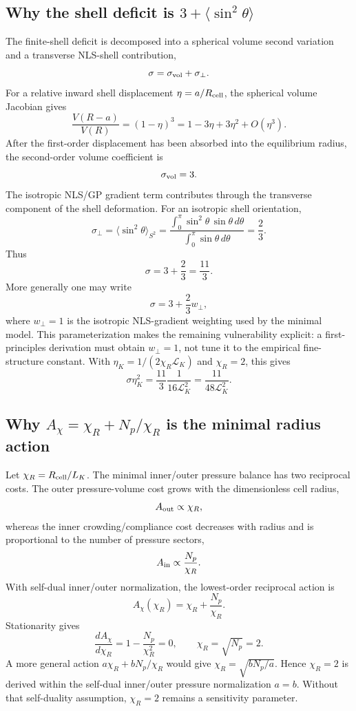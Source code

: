 \documentclass[11pt]{article}
\begin{document}
\subsection{Why the shell deficit is \(3+\langle\sin^2\theta\rangle\)}
\label{subsec:why-shell-deficit}

The finite-shell deficit is decomposed into a spherical volume second variation
and a transverse NLS-shell contribution,
\[
  \sigma=\sigma_{\rm vol}+\sigma_{\perp}.
\]
For a relative inward shell displacement \(\eta=a/R_{\rm cell}\), the spherical
volume Jacobian gives
\[
  \frac{V(R-a)}{V(R)}
  =
  (1-\eta)^3
  =
  1-3\eta+3\eta^2+O(\eta^3).
\]
After the first-order displacement has been absorbed into the equilibrium
radius, the second-order volume coefficient is
\[
  \sigma_{\rm vol}=3.
\]
The isotropic NLS/GP gradient term contributes through the transverse component
of the shell deformation.  For an isotropic shell orientation,
\[
  \sigma_\perp
  =
  \langle\sin^2\theta\rangle_{S^2}
  =
  \frac{\int_0^\pi \sin^2\theta\,\sin\theta\,d\theta}
       {\int_0^\pi \sin\theta\,d\theta}
  =
  \frac{2}{3}.
\]
Thus
\[
  \sigma=3+\frac{2}{3}=\frac{11}{3}.
\]
More generally one may write
\[
  \sigma=3+\frac{2}{3}w_\perp,
\]
where \(w_\perp=1\) is the isotropic NLS-gradient weighting used by the
minimal model.  This parameterization makes the remaining vulnerability
explicit: a first-principles derivation must obtain \(w_\perp=1\), not tune it
to the empirical fine-structure constant.
With \(\eta_K=1/(2\chi_R\mathcal L_K)\) and \(\chi_R=2\), this gives
\[
  \sigma\eta_K^2
  =
  \frac{11}{3}\frac{1}{16\mathcal L_K^2}
  =
  \frac{11}{48\mathcal L_K^2}.
\]

\subsection{Why \(A_\chi=\chi_R+N_p/\chi_R\) is the minimal radius action}
\label{subsec:why-radius-action}

Let \(\chi_R=R_{\rm cell}/L_K\).  The minimal inner/outer pressure balance has
two reciprocal costs.  The outer pressure-volume cost grows with the
dimensionless cell radius,
\[
  A_{\rm out}\propto \chi_R,
\]
whereas the inner crowding/compliance cost decreases with radius and is
proportional to the number of pressure sectors,
\[
  A_{\rm in}\propto \frac{N_p}{\chi_R}.
\]
With self-dual inner/outer normalization, the lowest-order reciprocal action is
\[
  A_\chi(\chi_R)
  =
  \chi_R+\frac{N_p}{\chi_R}.
\]
Stationarity gives
\[
  \frac{dA_\chi}{d\chi_R}
  =
  1-\frac{N_p}{\chi_R^2}=0,
  \qquad
  \chi_R=\sqrt{N_p}=2.
\]
A more general action \(a\chi_R+bN_p/\chi_R\) would give
\(\chi_R=\sqrt{bN_p/a}\).  Hence \(\chi_R=2\) is derived within the
self-dual inner/outer pressure normalization \(a=b\).  Without that
self-duality assumption, \(\chi_R=2\) remains a sensitivity parameter.
\end{document}

